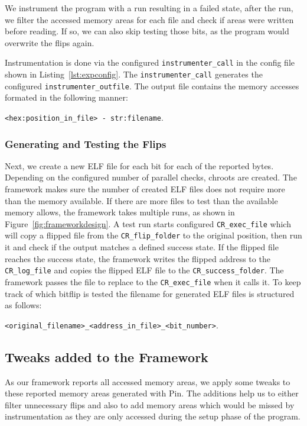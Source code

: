 We instrument the program with a run resulting in a failed state, after the run,
we filter the accessed memory areas for each file and check if areas were
written before reading. If so, we can also skip testing those bits, as the
program would overwrite the flips again.

Instrumentation is done via the configured \texttt{instrumenter\_call} in the
config file shown in Listing~\ref{lst:expconfig}. The
\texttt{instrumenter\_call} generates the configured
\texttt{instrumenter\_outfile}. The output file contains the memory accesses
formated in the following manner:

\mbox{\texttt{<hex:position\_in\_file> - str:filename}}.

\subsubsection{Generating and Testing the Flips}

Next, we create a new ELF file for each bit for each of the reported bytes.
Depending on the configured number of parallel checks, chroots are created. The
framework makes sure the number of created ELF files does not require more than
the memory available. If there are more files to test than the available memory
allows, the framework takes multiple runs, as shown in
Figure~\ref{fig:frameworkdesign}. A test run starts configured
\texttt{CR\_exec\_file} which will copy a flipped file from the
\texttt{CR\_flip\_folder} to the original position, then run it and check if the
output matches a defined success state. If the flipped file reaches the success
state, the framework writes the flipped address to the \texttt{CR\_log\_file}
and copies the flipped ELF file to the \texttt{CR\_success\_folder}. The
framework passes the file to replace to the \texttt{CR\_exec\_file} when it
calls it. To keep track of which bitflip is tested the filename for generated
ELF files is structured as follows:

\mbox{\texttt{<original\_filename>\_<address\_in\_file>\_<bit\_number>}}.

\subsection{Tweaks added to the Framework}

As our framework reports all accessed memory areas, we apply some tweaks to
these reported memory areas generated with Pin. The additions help us to either
filter unnecessary flips and also to add memory areas which would be missed by
instrumentation as they are only accessed during the setup phase of the program.

